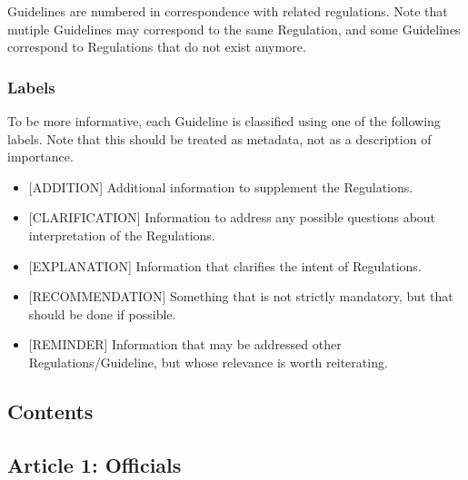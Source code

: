 Guidelines are numbered in correspondence with related regulations. Note
that mutiple Guidelines may correspond to the same Regulation, and some
Guidelines correspond to Regulations that do not exist anymore.

\subsubsection{Labels}

To be more informative, each Guideline is classified using one of the
following labels. Note that this should be treated as metadata, not as a
description of importance.

\begin{itemize}
\item
  {[}ADDITION{]} Additional information to supplement the Regulations.
\item
  {[}CLARIFICATION{]} Information to address any possible questions
  about interpretation of the Regulations.
\item
  {[}EXPLANATION{]} Information that clarifies the intent of
  Regulations.
\item
  {[}RECOMMENDATION{]} Something that is not strictly mandatory, but
  that should be done if possible.
\item
  {[}REMINDER{]} Information that may be addressed other
  Regulations/Guideline, but whose relevance is worth reiterating.
\end{itemize}

\subsection{Contents}

\subsection{ Article 1: Officials}

